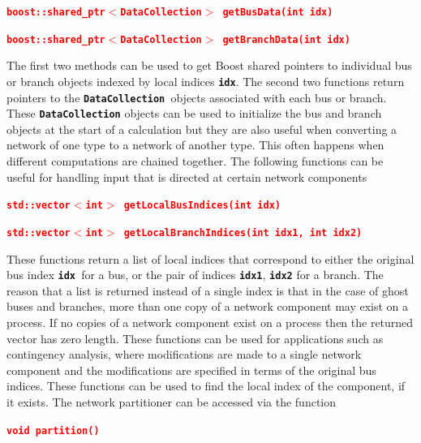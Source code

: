 \documentclass[12pt]{report} %
\begin{document}
\textcolor{red}{\texttt{\textbf{boost::shared\_ptr$\boldsymbol{\mathrm{<}}$DataCollection$\boldsymbol{\mathrm{>}}$ getBusData(int idx)}}}

\textcolor{red}{\texttt{\textbf{}}}
\textcolor{red}{\texttt{\textbf{boost::shared\_ptr$\boldsymbol{\mathrm{<}}$DataCollection$\boldsymbol{\mathrm{>}}$ getBranchData(int idx)}}}

The first two methods can be used to get Boost shared pointers to individual bus or branch objects indexed by local indices \texttt{\textbf{idx}}. The second two functions return pointers to the \texttt{\textbf{DataCollection }}objects associated with each bus or branch. These \texttt{\textbf{DataCollection}} objects can be used to initialize the bus and branch objects at the start of a calculation but they are also useful when converting a network of one type to a network of another type. This often happens when different computations are chained together.
The following functions can be useful for handling input that is directed at certain network components

\textcolor{red}{\texttt{\textbf{std::vector$\boldsymbol{\mathrm{<}}$int$\boldsymbol{\mathrm{>}}$ getLocalBusIndices(int idx)}}}

\textcolor{red}{\texttt{\textbf{std::vector$\boldsymbol{\mathrm{<}}$int$\boldsymbol{\mathrm{>}}$ getLocalBranchIndices(int idx1, int idx2)}}}

These functions return a list of local indices that correspond to either the original bus index \texttt{\textbf{idx }}for a bus, or the pair of indices \texttt{\textbf{idx1}}, \texttt{\textbf{idx2}} for a branch. The reason that a list is returned instead of a single index is that in the case of ghost buses and branches, more than one copy of a network component may exist on a process. If no copies of a network component exist on a process then the returned vector has zero length. These functions can be used for applications such as contingency analysis, where modifications are made to a single network component and the modifications are specified in terms of the original bus indices. These functions can be used to find the local index of the component, if it exists. 
The network partitioner can be accessed via the function

\textcolor{red}{\texttt{\textbf{void partition()}}}
\end{document}
